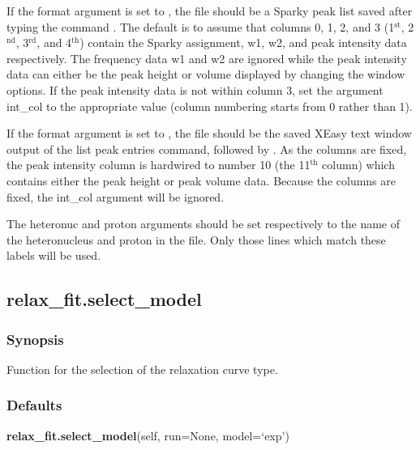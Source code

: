  If the format argument is set to , the file should be a Sparky peak list saved after typing the command .  The default is to assume that columns 0, 1, 2, and 3 (1$^\mathrm{st}$, 2$^\mathrm{nd}$, 3$^\mathrm{rd}$, and 4$^\mathrm{th}$) contain the Sparky assignment, w1, w2, and peak intensity data respectively. The frequency data w1 and w2 are ignored while the peak intensity data can either be the peak height or volume displayed by changing the window options.  If the peak intensity data is not within column 3, set the argument int\_col to the appropriate value (column numbering starts from 0 rather than 1). 
  

 If the format argument is set to , the file should be the saved XEasy text window output of the list peak entries command,  followed by .  As the columns are fixed, the peak intensity column is hardwired to number 10 (the 11$^\mathrm{th}$ column) which contains either the peak height or peak volume data.  Because the columns are fixed, the int\_col argument will be ignored. 
  

 The heteronuc and proton arguments should be set respectively to the name of the heteronucleus and proton in the file.  Only those lines which match these labels will be used. 
  

  

 \newpage 

 \subsection{relax\_fit.select\_model} 

  
 \subsubsection{Synopsis} 

 Function for the selection of the relaxation curve type. 
  

  
 \subsubsection{Defaults} 

 \textsf{\textbf{relax\_fit.select\_model}(self, run=None, model=`exp')} 

